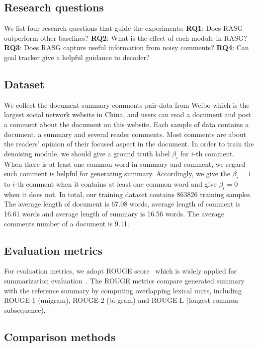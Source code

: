 \documentclass[letterpaper]{article} \usepackage{aaai19}  \usepackage{times}  \usepackage{helvet}  \usepackage{courier}
\begin{document}
\subsection{Research questions}

We list four research questions that guide the experiments: 
\noindent \textbf{RQ1}: Does RASG outperform other baselines?
\noindent \textbf{RQ2}: What is the effect of each module in RASG? 
\noindent \textbf{RQ3}: Does RASG capture useful information from noisy comments?
\noindent \textbf{RQ4}: Can goal tracker give a helpful guidance to decoder?


\subsection{Dataset}

We collect the document-summary-comments pair data from Weibo which is the largest social network website in China, and users can read a document and post a comment about the document on this website.
Each sample of data contains a document, a summary and several reader comments.
Most comments are about the readers' opinion of their focused aspect in the document.
In order to train the denoising module, we should give a ground truth label $\beta_i$ for $i$-th comment.
When there is at least one common word in summary and comment, we regard such comment is helpful for generating summary.
Accordingly, we give the $\beta_i = 1$ to $i$-th comment when it contains at least one common word and give $\beta_i = 0$ when it does not.
In total, our training dataset contains 863826 training samples.
The average length of document is 67.08 words, average length of comment is 16.61 words and average length of summary is 16.56 words.
The average comments number of a document is 9.11.


\subsection{Evaluation metrics}

For evaluation metrics, we adopt ROUGE score~\cite{lin2004rouge} which is widely applied for summarization evaluation~\cite{Sun2018AUM,chen2018iterative}. 
The ROUGE metrics compare generated summary with the reference summary by computing overlapping lexical units, including ROUGE-1 (unigram), ROUGE-2 (bi-gram) and ROUGE-L (longest common subsequence). 

\subsection{Comparison methods}
\end{document}
